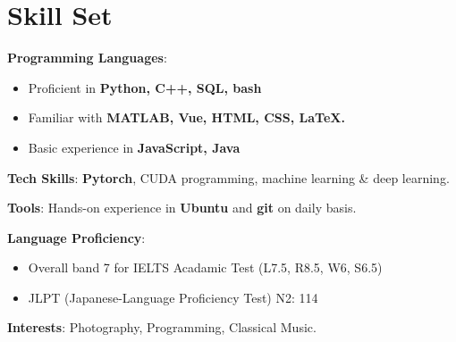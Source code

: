 \documentclass{chicv}
\begin{document}
\section{Skill Set}
\begin{compactlist}
  \item \textbf{Programming Languages}: 
  \begin{itemize}
    \item Proficient in \textbf{Python, C++, SQL, bash}
    \item Familiar with \textbf{MATLAB, Vue, HTML, CSS, \LaTeX.}
    \item Basic experience in \textbf{JavaScript, Java}
  \end{itemize}
  \item \textbf{Tech Skills}: \textbf{Pytorch}, CUDA programming, machine learning \& deep learning.
  \item \textbf{Tools}: Hands-on experience in \textbf{Ubuntu} and \textbf{git} on daily basis.
  \item \textbf{Language Proficiency}: 
  \begin{itemize}
    \item Overall band 7 for IELTS Acadamic Test (L7.5, R8.5, W6, S6.5)
    \item JLPT (Japanese-Language Proficiency Test) N2: 114
  \end{itemize}
  \item \textbf{Interests}: Photography, Programming, Classical Music.
\end{compactlist}
\end{document}
